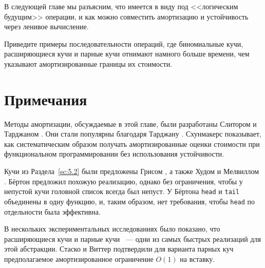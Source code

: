 В следующей главе мы разъясним, что имеется в виду под <<логическим
будущим>> операции, и как можно совместить амортизацию и устойчивость
через ленивое вычисление.

\begin{exercise}\label{ex:5.9}
  Приведите примеры последовательности операций, где биномиальные
  кучи, расширяющиеся кучи и парные кучи отнимают намного больше
  времени, чем указывают амортизированные границы их стоимости.
\end{exercise}

\section{Примечания}

Методы амортизации, обсуждаемые в этой главе, были разработаны
Слитором и Тарджаном \cite{SleatorTarjan1985, SleatorTarjan1986b}. Они
стали популярны благодаря Тарджану \cite{Tarjan1985}. Схунмакерс
\cite{Schoenmakers1992} показывает, как систематическим образом
получать амортизированные оценки стоимости при функциональном
программировании без использования устойчивости.

Кучи из Раздела~\ref{sc:5.2} были предложены Грисом
\cite[с.~250-251]{Gries1981}, а также Худом и Мелвиллом
\cite{HoodMelville1981}. Бёртон \cite{Burton1982} предложил похожую
реализацию, однако без ограничения, чтобы у непустой кучи головной список всегда был
непуст. У Бёртона \lstinline!head! и \lstinline!tail! объединены в
одну функцию, и, таким образом, нет требования, чтобы \lstinline!head!
по отдельности была эффективна.

В нескольких экспериментальных исследованиях было показано, что
расширяющиеся кучи \cite{Jones1986} и парные кучи
\cite{MoretShapiro1991,Liao1992}~--- одни из самых быстрых
реализаций для этой абстракции. Стаско и Виттер
\cite{StaskoVitter1987} подтвердили для варианта парных куч
предполагаемое амортизированное ограничение $O(1)$ на вставку.

